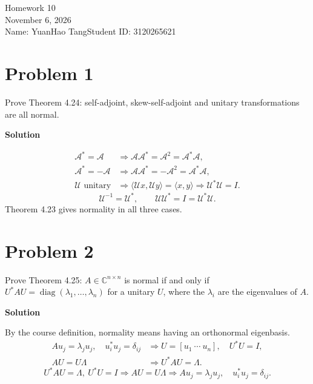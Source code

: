 \documentclass[UTF8,10pt,letterpaper,fontset=fandol]{ctexart}
\newcommand{\C}{\mathbb C}
\newcommand{\ip}[2]{\langle #1,#2\rangle}
\begin{document}
\begin{center}
{\LARGE Homework 10}\\[0.5em]
November 6, 2026\\[0.25em]
Name: YuanHao Tang\quad Student ID: 3120265621
\end{center}
\section{Problem 1}
Prove Theorem 4.24: self-adjoint, skew-self-adjoint and unitary transformations are all normal.
\par{}\textbf{Solution}\par

\begin{align*}
 \mathcal A^*=\mathcal A&\Longrightarrow
 \mathcal A\mathcal A^*=\mathcal A^2=\mathcal A^*\mathcal A,\\
 \mathcal A^*=-\mathcal A&\Longrightarrow
 \mathcal A\mathcal A^*=-\mathcal A^2=\mathcal A^*\mathcal A,\\
 \mathcal U\text{ unitary}&\Longrightarrow
 \ip{\mathcal Ux}{\mathcal Uy}=\ip xy
 \Longrightarrow \mathcal U^*\mathcal U=I.
\end{align*}
\[
 \mathcal U^{-1}=\mathcal U^*,\qquad
 \mathcal U\mathcal U^*=I=\mathcal U^*\mathcal U.
\]
Theorem 4.23 gives normality in all three cases.
\section{Problem 2}
Prove Theorem 4.25: $A\in\C^{n\times n}$ is normal if and only if $U^*AU=\operatorname{diag}(\lambda_1,\ldots,\lambda_n)$ for a unitary $U$, where the $\lambda_i$ are the eigenvalues of $A$.
\par{}\textbf{Solution}\par
By the course definition, normality means having an orthonormal eigenbasis.
\begin{align*}
 Au_j=\lambda_ju_j,\quad u_i^*u_j=\delta_{ij}
 &\Longrightarrow U=[u_1\ \cdots\ u_n],\quad U^*U=I,\\
 AU=U\Lambda&\Longrightarrow U^*AU=\Lambda.
\end{align*}
\[
 U^*AU=\Lambda,\ U^*U=I
 \Longrightarrow AU=U\Lambda
 \Longrightarrow Au_j=\lambda_ju_j,\quad u_i^*u_j=\delta_{ij}.
\]
\end{document}

